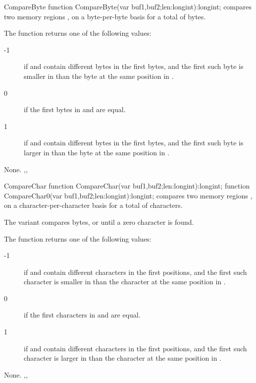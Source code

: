\begin{function}{CompareByte}
\Declaration
function CompareByte(var buf1,buf2;len:longint):longint;
\Description
{} compares two memory regions , on a
byte-per-byte basis for a total of  bytes.

The function returns one of the following values:
\begin{description}
\item[-1] if  and  contain different bytes
in the first  bytes, and the first such byte is smaller in 
than the byte at the same position in .
\item[0]  if the first  bytes in  and  are
equal.
\item [1] if  and  contain different bytes
in the first  bytes, and the first such byte is larger in 
than the byte at the same position in .
\end{description}
\Errors
None.
\SeeAlso
{},,
\end{function}


\begin{function}{CompareChar}
\Declaration
function  CompareChar(var buf1,buf2;len:longint):longint;
function  CompareChar0(var buf1,buf2;len:longint):longint;
\Description
{} compares two memory regions , on a
character-per-character basis for a total of  characters.

The  variant compares  bytes, or until
a zero character is found.

The function returns one of the following values:
\begin{description}
\item[-1] if  and  contain different characters
in the first  positions, and the first such character is smaller in 
than the character at the same position in .
\item[0]  if the first  characters in  and  are
equal.
\item [1] if  and  contain different characters
in the first  positions, and the first such character is larger in
 than the character at the same position in .
\end{description}

\Errors
None.
\SeeAlso
{},,
\end{function}

